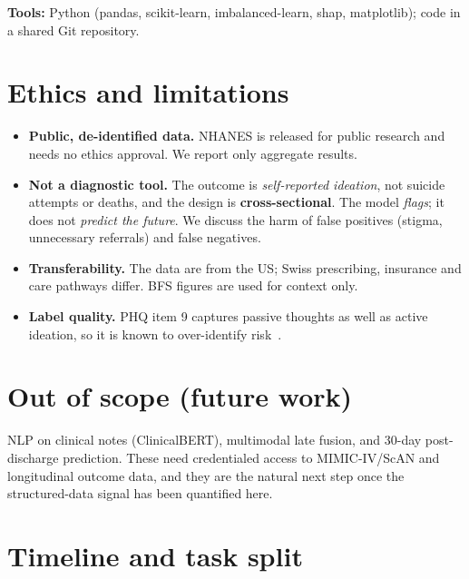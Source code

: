 \documentclass[11pt,a4paper]{article}
\begin{document}
\textbf{Tools:} Python (pandas, scikit-learn, imbalanced-learn, shap, matplotlib); code
in a shared Git repository.

\section{Ethics and limitations}

\begin{itemize}
  \item \textbf{Public, de-identified data.} NHANES is released for public research
        and needs no ethics approval. We report only aggregate results.
  \item \textbf{Not a diagnostic tool.} The outcome is \textit{self-reported
        ideation}, not suicide attempts or deaths, and the design is
        \textbf{cross-sectional}. The model \textit{flags}; it does not \textit{predict
        the future}. We discuss the harm of false positives (stigma, unnecessary
        referrals) and false negatives.
  \item \textbf{Transferability.} The data are from the US; Swiss prescribing,
        insurance and care pathways differ. BFS figures are used for context only.
  \item \textbf{Label quality.} PHQ item 9 captures passive thoughts as well as active
        ideation, so it is known to over-identify risk~\cite{kroenke2001}.
\end{itemize}

\section{Out of scope (future work)}

NLP on clinical notes (ClinicalBERT), multimodal late fusion, and 30-day
post-discharge prediction. These need credentialed access to MIMIC-IV/ScAN and
longitudinal outcome data, and they are the natural next step once the
structured-data signal has been quantified here.

\section{Timeline and task split}
\end{document}
